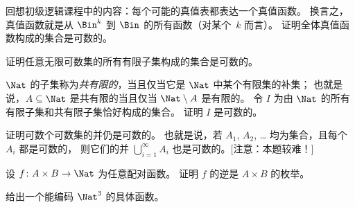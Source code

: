 \documentclass[../../../include/open-logic-section]{subfiles}
\begin{document}
\begin{prob}
回想初级逻辑课程中的内容：每个可能的真值表都表达一个真值函数。
换言之，真值函数就是从 $\Bin^k$ 到 $\Bin$ 的所有函数（对某个~$k$ 而言）。
证明全体真值函数构成的集合是可数的。
\end{prob}

\begin{prob}
证明任意无限可数集的所有有限子集构成的集合是可数的。
\end{prob}

\begin{prob}
$\Nat$ 的子集称为\emph{共有限的}，当且仅当它是 $\Nat$ 中某个有限集的补集；
也就是说，$A \subseteq \Nat$ 是共有限的当且仅当 $\Nat\setminus A$ 是有限的。
令 $I$ 为由 $\Nat$ 的所有有限子集和共有限子集恰好构成的集合。
证明 $I$ 是可数的。
\end{prob}

\begin{prob}
证明可数个可数集的并仍是可数的。
也就是说，若 $A_1$, $A_2$, \dots{} 均为集合，且每个 $A_i$ 都是可数的，
则它们的并 $\bigcup_{i=1}^\infty
A_i$ 也是可数的。[注意：本题较难！]
\end{prob}

\begin{prob}
设 $f \colon A \times B \to \Nat$ 为任意配对函数。
证明 $f$ 的逆是 $A \times B$ 的枚举。
\end{prob}

\begin{prob}
给出一个能编码 $\Nat^3$ 的具体函数。
\end{prob}
\end{document}
